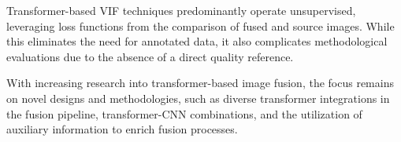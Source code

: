 Transformer-based VIF techniques predominantly operate unsupervised, leveraging loss functions from the comparison of fused and source images. While this eliminates the need for annotated data, it also complicates methodological evaluations due to the absence of a direct quality reference.

With increasing research into transformer-based image fusion, the focus remains on novel designs and methodologies, such as diverse transformer integrations in the fusion pipeline, transformer-CNN combinations, and the utilization of auxiliary information to enrich fusion processes.
